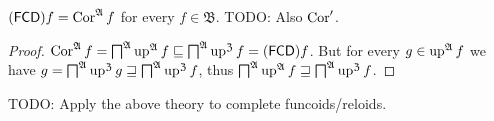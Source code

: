 \begin{prop}
 $(\mathsf{FCD}) f = \operatorname{Cor}^{\mathfrak{A}} f$ for every $f\in\mathfrak{B}$. TODO: Also $\operatorname{Cor}'$.
\end{prop}

\begin{proof}
$\operatorname{Cor}^{\mathfrak{A}} f = \bigsqcap^{\mathfrak{A}}\operatorname{up}^{\mathfrak{A}} f \sqsubseteq
\bigsqcap^{\mathfrak{A}}\operatorname{up}^{\mathfrak{Z}} f = (\mathsf{FCD}) f$.
But for every $g\in\operatorname{up}^{\mathfrak{A}} f$ we have
$g=\bigsqcap^{\mathfrak{A}}\operatorname{up}^{\mathfrak{Z}} g \sqsupseteq
\bigsqcap^{\mathfrak{A}}\operatorname{up}^{\mathfrak{Z}} f$, thus
$\bigsqcap^{\mathfrak{A}}\operatorname{up}^{\mathfrak{A}} f \sqsupseteq
\bigsqcap^{\mathfrak{A}}\operatorname{up}^{\mathfrak{Z}} f$.
\end{proof}

TODO: Apply the above theory to complete funcoids/reloids.
